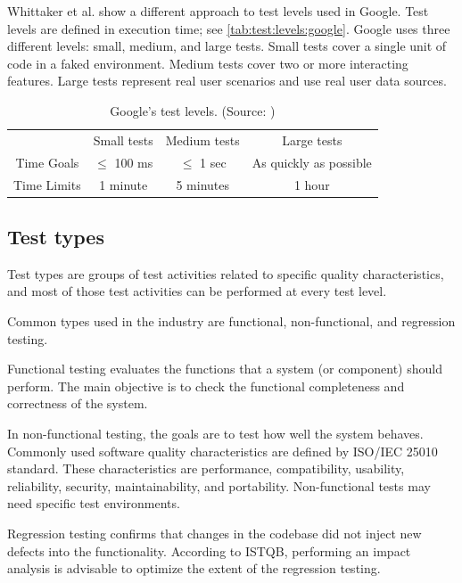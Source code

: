 Whittaker et al. show \cite{google:2012} a different approach to test levels used
in Google.
Test levels are defined in execution time; see \autoref{tab:test:levels:google}.
Google uses three different levels: small, medium, and large tests.
Small tests cover a single unit of code in a faked environment.
Medium tests cover two or more interacting features.
Large tests represent real user scenarios and use real user data sources.

\begin{table}
    \centering
    \begin{tabular}{|c c c c|}
        \hline
                    & Small tests   & Medium tests & Large tests            \\
        Time Goals  & $\leq$ 100 ms & $\leq$ 1 sec & As quickly as possible \\
        Time Limits & 1 minute      & 5 minutes    & 1 hour                 \\
        \hline
    \end{tabular}
    \caption{Google's test levels. (Source: \cite{google:2012})}
    \label{tab:test:levels:google}
\end{table}

\subsection{Test types}
Test types are groups of test activities related to specific quality characteristics, and most of those test activities can be performed at every test level. \cite{ctfl_syllabus:2023}

Common types used in the industry are functional, non-functional, and regression testing.

Functional testing evaluates the functions that a system (or component) should perform. The main objective is to check the functional completeness and correctness of the system.

In non-functional testing, the goals are to test how well the system behaves. Commonly used software quality characteristics are defined by ISO/IEC 25010 standard\cite{iso_25010:2011}. These characteristics are performance, compatibility, usability, reliability, security, maintainability, and portability. Non-functional tests may need specific test environments.

Regression testing confirms that changes in the codebase did not inject new defects into the functionality. According to ISTQB, performing an impact analysis is advisable to optimize the extent of the regression testing.

